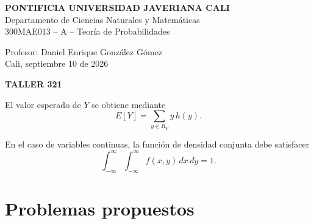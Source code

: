 \documentclass[11pt,letterpaper]{article}
\begin{document}
\pagestyle{empty}

\textbf{PONTIFICIA UNIVERSIDAD JAVERIANA CALI}\\
Departamento de Ciencias Naturales y Matemáticas\\
300MAE013 -- A -- Teoría de Probabilidades

\begin{flushright}
Profesor: Daniel Enrique González Gómez\\
Cali, septiembre 10 de 2026
\end{flushright}

\begin{center}
  {\Large\bfseries TALLER 321}
\end{center}

\vspace{0.4cm}

El valor esperado de \(Y\) se obtiene mediante
\[
E[Y]=\sum_{y\in R_Y} y\,h(y).
\]

En el caso de variables continuas, la función de densidad conjunta debe satisfacer
\[
\int_{-\infty}^{\infty}\int_{-\infty}^{\infty}
 f(x,y)\,dx\,dy=1.
\]

\vspace{0.4cm}
\section*{Problemas propuestos}
\end{document}
